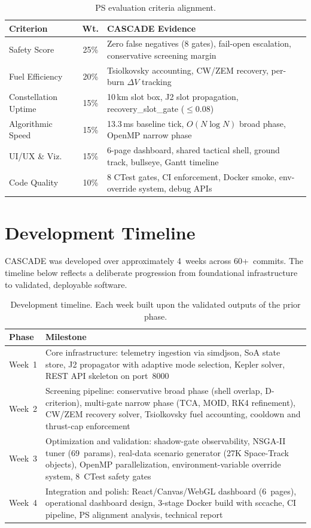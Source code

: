 \documentclass[10pt,twocolumn,letterpaper]{article}
\begin{document}
\begin{table}[h]
\centering\small
\begin{tabularx}{\linewidth}{@{}lcX@{}}
\toprule
\textbf{Criterion} & \textbf{Wt.} & \textbf{CASCADE Evidence} \\
\midrule
Safety Score    & 25\% & Zero false negatives (8 gates), fail-open
  escalation, conservative screening margin \\
Fuel Efficiency & 20\% & Tsiolkovsky accounting, CW/ZEM recovery,
  per-burn $\Delta V$ tracking \\
Constellation Uptime & 15\% & 10\,km slot box, J2 slot propagation,
  recovery\_slot\_gate ($\leq 0.08$) \\
Algorithmic Speed & 15\% & 13.3\,ms baseline tick, $O(N\log N)$
  broad phase, OpenMP narrow phase \\
UI/UX \& Viz.  & 15\% & 6-page dashboard, shared tactical shell,
  ground track, bullseye, Gantt timeline \\
Code Quality    & 10\% & 8 CTest gates, CI enforcement, Docker smoke,
  env-override system, debug APIs \\
\bottomrule
\end{tabularx}
\caption{PS evaluation criteria alignment.}
\label{tab:ps}
\end{table}

\section{Development Timeline}\label{app:timeline}

CASCADE was developed over approximately 4~weeks across 60+~commits.
The timeline below reflects a deliberate progression from foundational
infrastructure to validated, deployable software.

\begin{table}[h]
\centering\small
\begin{tabularx}{\linewidth}{@{}lX@{}}
\toprule
\textbf{Phase} & \textbf{Milestone} \\
\midrule
Week~1 & Core infrastructure: telemetry ingestion via simdjson, SoA
  state store, J2 propagator with adaptive mode selection, Kepler
  solver, REST API skeleton on port~8000 \\
Week~2 & Screening pipeline: conservative broad phase (shell overlap,
  D-criterion), multi-gate narrow phase (TCA, MOID, RK4 refinement),
  CW/ZEM recovery solver, Tsiolkovsky fuel accounting, cooldown and
  thrust-cap enforcement \\
Week~3 & Optimization and validation: shadow-gate observability, NSGA-II
  tuner (69~params), real-data scenario generator (27K Space-Track
  objects), OpenMP parallelization, environment-variable override
  system, 8~CTest safety gates \\
Week~4 & Integration and polish: React/Canvas/WebGL dashboard (6~pages),
  operational dashboard design, 3-stage Docker build with sccache,
  CI pipeline, PS alignment analysis, technical report \\
\bottomrule
\end{tabularx}
\caption{Development timeline.  Each week built upon the validated outputs
  of the prior phase.}
\label{tab:timeline}
\end{table}
\end{document}
